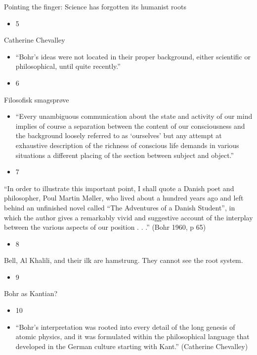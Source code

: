 \documentclass{beamer}
\begin{document}
\begin{frame}{Pointing the finger: Science has forgotten its humanist roots}
\begin{itemize}
  \item 5
\end{itemize}
\end{frame}
\begin{frame}{Catherine Chevalley}
\begin{itemize}
  \item “Bohr’s ideas were not located in their proper background, either scientific or philosophical, until quite recently.”
  \item 6
\end{itemize}
\end{frame}
\begin{frame}{Filosofisk smagsprøve}
\begin{itemize}
  \item “Every unambiguous communication about the state and activity of our mind implies of course a separation between the content of our consciousness and the background loosely referred to as ‘ourselves’ but any attempt at exhaustive description of the richness of conscious life demands in various situations a different placing of the section between subject and object.”
  \item 7
\end{itemize}
\end{frame}
\begin{frame}{“In order to illustrate this important point, I shall quote a Danish poet and philosopher, Poul Martin Møller, who lived about a hundred years ago and left behind an unfinished novel called “The Adventures of a Danish Student”, in which the author gives a remarkably vivid and suggestive account of the interplay between the various aspects of our position . . .” (Bohr 1960, p 65)}
\begin{itemize}
  \item 8
\end{itemize}
\end{frame}
\begin{frame}{Bell, Al Khalili, and their ilk are hamstrung. They cannot see the root system.}
\begin{itemize}
  \item 9
\end{itemize}
\end{frame}
\begin{frame}{Bohr as Kantian?}
\begin{itemize}
  \item 10
  \item “Bohr’s interpretation was rooted into every detail of the long genesis of atomic physics, and it was formulated within the philosophical language that developed in the German culture starting with Kant.” (Catherine Chevalley)
\end{itemize}
\end{frame}
\end{document}
